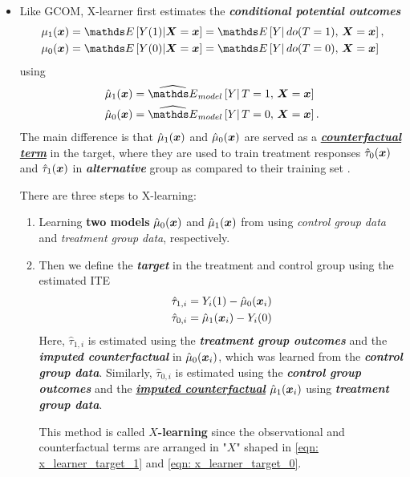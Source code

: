 \documentclass[11pt]{article}
\begin{document}
\begin{itemize}
\item Like GCOM, X-learner first estimates the \emph{\textbf{conditional potential outcomes}}
\begin{align}
\mu_1(\mb{x}) &= \E{}{Y(1) | \mb{X} = \mb{x}} = \E{}{Y |\, do(T=1),\,\mb{X} = \mb{x}} , \label{eqn: x_learner_counter_1}\\
 \mu_0(\mb{x}) &= \E{}{Y(0) | \mb{X} = \mb{x}} =  \E{}{Y |\, do(T=0),\, \mb{X} = \mb{x}}   \label{eqn: x_learner_counter_0}
\end{align} using
\begin{align*}
\hat{\mu}_1(\mb{x}) &= \Em{model}{Y |\, T=1,\, \mb{X} = \mb{x}} \\
\hat{\mu}_0(\mb{x}) &= \Em{model}{Y |\, T=0,\, \mb{X} = \mb{x}}.
\end{align*} The main difference is that $\hat{\mu}_1(\boldsymbol{x})$ and $\hat{\mu}_0(\boldsymbol{x})$ are served as a \underline{\textbf{\emph{counterfactual term}}} in the target, where they are used to train treatment responses $\hat{\tau}_0(\boldsymbol{x})$ and $\hat{\tau}_1(\boldsymbol{x})$ in \emph{\textbf{alternative}} group as compared to their training set .

There are three steps to X-learning:
\begin{enumerate}
\item Learning \textbf{two models} $\hat{\mu}_0(\boldsymbol{x})$ and $\hat{\mu}_1(\boldsymbol{x})$ from using \emph{control group data} and \emph{treatment group data}, respectively. 

\item Then we define the \emph{\textbf{target}} in the treatment and control group using the estimated ITE
\begin{align}
\hat{\tau}_{1,i} &= Y_i(1) - \hat{\mu}_0(\boldsymbol{x}_i)  \label{eqn: x_learner_target_1}\\
\hat{\tau}_{0,i} &=  \hat{\mu}_1(\boldsymbol{x}_i)  - Y_i(0) \label{eqn: x_learner_target_0}
\end{align} Here, $\hat{\tau}_{1,i}$ is estimated using the \textbf{\emph{treatment group outcomes}} and the \emph{\textbf{imputed counterfactual}} in $\hat{\mu}_0(\boldsymbol{x}_i)$, which was learned from the \emph{\textbf{control group data}}. Similarly, $\hat{\tau}_{0,i}$ is estimated using the \emph{\textbf{control group outcomes}} and the \underline{\emph{\textbf{imputed counterfactual}}} $\hat{\mu}_1(\boldsymbol{x}_i)$ using \emph{\textbf{treatment group data}}. 

This method is called \textbf{$X$-learning} since the observational and counterfactual terms are arranged in "$X$" shaped in \eqref{eqn: x_learner_target_1} and \eqref{eqn: x_learner_target_0}. 


\end{enumerate}
\end{itemize}
\end{document}
